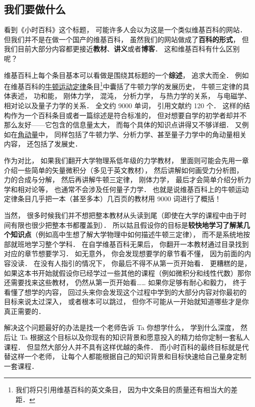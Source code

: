 
\subsection{我们要做什么}

看到《小时百科》这个标题， 可能许多人会以为这是一个类似维基百科的网站． 但我们并不是在做一个国产的维基百科， 虽然我们的网站做成了\textbf{百科的形式}， 但我们目前大部分内容都更接近\textbf{教材}、\textbf{讲义}或者\textbf{博客}． 这和维基百科有什么区别呢？

维基百科上每个条目基本可以看做是围绕其标题的一个\textbf{综述}， 追求大而全． 例如在维基百科的\href{https://en.wikipedia.org/wiki/Newton's_laws_of_motion}{牛顿运动定律}条目\footnote{我们将只引用维基百科的英文条目， 因为中文条目的质量还有相当大的差距．}中囊括了牛顿力学的发展历史， 牛顿三定律的具体表述， 功和能， 刚体力学， 混沌， 分析力学， 与热力学的关系， 与电磁学、相对论以及量子力学的关系． 全文约 9000 单词， 引用文献约 120 个． 这样的结构作为一个百科条目或者一篇综述是符合标准的， 但对想要自学的初学者却并不那么友好——它包含的信息量太大， 而每个具体的知识点讲得又不够详细． 又例如在\href{https://en.wikipedia.org/wiki/Angular_momentum}{角动量}中， 同样包括了牛顿力学、分析力学、甚至量子力学中的角动量相关内容， 还包括了发展史．

作为对比， 如果我们翻开大学物理系低年级的力学教材， 里面则可能会先用一章介绍一些简单的矢量微积分（多见于英文教材）， 然后讲解如何画受力分析图， 力的合成与分解， 然后再讲解牛顿三定律， 刚体力学， 最后才会简单介绍分析力学和相对论等， 也通常不会涉及任何量子力学． 也就是说维基百科上的牛顿运动定律条目几乎把一本（甚至多本）几百页的教材用 9000 词进行了概括！

当然， 很多时候我们并不想把整本教材从头读到尾（即使在大学的课程中由于时间有限也很少把整本书都覆盖到）． 所以姑且假设你的目标是\textbf{较快地学习了解某几个知识点}（例如高中生想了解大学物理中如何描述牛顿三定律）， 而不是系统地按部就班地学习整个学科． 在自学维基百科无果后， 你翻开一本教材通过目录找到对应的章节想要学习． 如无意外， 你会发现想要学的章节看不懂， 因为前面的内容没读． 在没有人指引的情况下， 你最后不得不从第一页开始看． 更糟糕的是， 如果这本书开始就假设你已经学过一些其他的课程（例如微积分和线性代数）那你还需要找来这些教材， 仍然从第一页开始看…… 如果你足够有耐心和毅力， 终于看懂了想学的内容， 回过头来你会发现这个过程中学到的大部分内容对你最初的目标来说太过深入， 或者根本可以跳过， 但你不可能从一开始就知道哪些才是你真正需要的．

解决这个问题最好的办法是找一个老师告诉 Ta 你想学什么， 学到什么深度， 然后让 Ta 根据这个目标以及你现有的知识背景和愿意投入的精力给你定制一套私人课程． 但显然大部分人并不具有这样优越的条件． 而小时百科的最终目标就是代替这样一个老师， 让每个人都能根据自己的知识背景和目标快速给自己量身定制一套课程．

